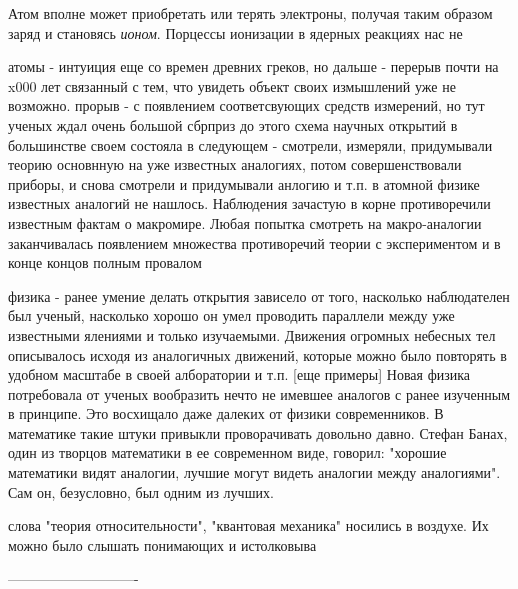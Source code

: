 Атом вполне может приобретать или терять электроны, получая таким образом заряд и становясь \textit{ионом}.
Порцессы ионизации в ядерных реакциях нас не 



атомы - интуиция еще со времен древних греков, но дальше - перерыв почти на x000 лет связанный с тем, что увидеть объект своих измышлений уже не возможно.
прорыв - с появлением соответсвующих средств измерений, но тут ученых ждал очень большой сбрприз
до этого схема научных открытий в большинстве своем состояла в следующем - смотрели, измеряли, придумывали теорию основнную на уже известных аналогиях, потом совершенствовали приборы, и снова смотрели и придумывали анлогию и т.п.
в атомной физике известных аналогий не нашлось. Наблюдения зачастую в корне противоречили известным фактам о макромире. Любая попытка смотреть на макро-аналогии заканчивалась появлением множества противоречий теории с экспериментом и в конце концов полным провалом 


физика - ранее умение делать открытия зависело от того, насколько наблюдателен был ученый, насколько хорошо он умел проводить параллели между уже известными ялениями и только изучаемыми.
Движения огромных небесных тел описывалось исходя из аналогичных движений, которые можно было повторять в удобном масштабе в своей алборатории и т.п. [еще примеры]
Новая физика потребовала от ученых вообразить нечто не имевшее аналогов с ранее изученным в принципе. 
Это восхищало даже далеких от физики современников.
В математике такие штуки привыкли проворачивать довольно давно. 
Стефан Банах, один из творцов математики в ее современном виде, говорил: "хорошие математики видят аналогии, лучшие могут видеть аналогии между аналогиями". Сам он, безусловно, был одним из лучших.

 
слова "теория относительности", "квантовая механика" носились в воздухе. Их можно было слышать  понимающих и истолковыва

----------------------------



